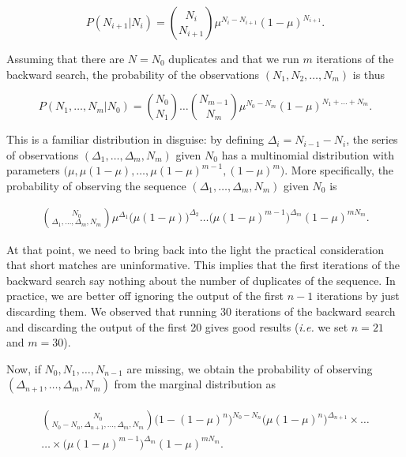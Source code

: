 \documentclass{article}
\begin{document}
\begin{equation*}
P(N_{i+1}|N_i) = {N_i \choose N_{i+1}}
\mu^{N_i-N_{i+1}}(1-\mu)^{N_{i+1}}.
\end{equation*}

Assuming that there are $N = N_0$ duplicates and that we run $m$
iterations of the backward search, the probability of the observations
$(N_1, N_2, \ldots, N_m)$ is thus

\begin{equation*}
P(N_1, \ldots, N_m|N_0) = 
{N_0 \choose N_1 } \ldots {N_{m-1} \choose N_m }
\mu^{N_0-N_m}(1-\mu)^{N_1+\ldots+N_m}.
\end{equation*}

This is a familiar distribution in disguise: by defining $\Delta_i =
N_{i-1} - N_i$, the series of observations $(\Delta_1, \ldots, \Delta_m,
N_m)$ given $N_0$ has a multinomial distribution with parameters
$\big(\mu, \mu(1-\mu), \ldots, \mu(1-\mu)^{m-1}, (1-\mu)^m\big)$. More
specifically, the probability of observing the sequence $(\Delta_1,
\ldots, \Delta_m, N_m)$ given $N_0$ is

\begin{align*}
{N_0 \choose \Delta_1, \ldots, \Delta_m, N_m}
\mu^{\Delta_1}\big(\mu(1-\mu)\big)^{\Delta_2}
\ldots \big(\mu(1-\mu)^{m-1}\big)^{\Delta_m}(1-\mu)^{mN_m}.
\end{align*}

At that point, we need to bring back into the light the practical
consideration that short matches are uninformative. This implies that the
first iterations of the backward search say nothing about the number of
duplicates of the sequence. In practice, we are better off ignoring the
output of the first $n-1$ iterations by just discarding them. We observed
that running 30 iterations of the backward search and discarding the
output of the first 20 gives good results (\textit{i.e.} we set $n = 21$
and $m=30$).

Now, if $N_0, N_1, \ldots, N_{n-1}$ are missing, we obtain the probability
of observing $(\Delta_{n+1}, \ldots, \Delta_m, N_m)$ from the marginal
distribution as

\begin{align*}
\begin{split}
{N_0 \choose N_0-N_n, \Delta_{n+1}, \ldots, \Delta_m, N_m}
\big(1-(1-\mu)^n\big)^{N_0-N_n}
\big(\mu(1-\mu)^n\big)^{\Delta_{n+1}} \times
\ldots \\
\ldots \times
\big(\mu(1-\mu)^{m-1}\big)^{\Delta_m}(1-\mu)^{mN_m}.
\end{split}
\end{align*}
\end{document}
